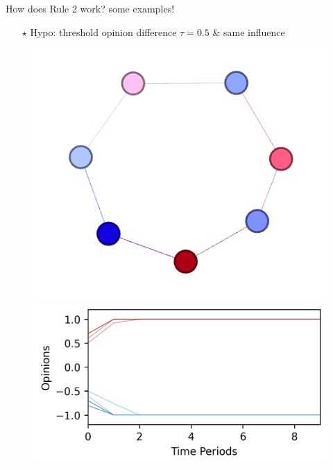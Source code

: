 \documentclass[xcolor=table]{beamer}
\begin{document}
%
\begin{frame}{How does Rule 2 work? some examples! }
\begin{itemize} \item[$\star$] Hypo: threshold opinion difference $\tau = 0.5$ \& same influence \end{itemize}
\begin{figure}
\centering
\begin{minipage}{.5\textwidth}
  \centering
  \includegraphics[scale = 0.55]{./img/ideo_opp_1.png}
\end{minipage}%
\begin{minipage}{.5\textwidth}
  \centering
  \includegraphics[scale = 0.55]{./img/plot_ideo_opposed.jpg}
\end{minipage}
\end{figure}

\end{frame}
\end{document}
